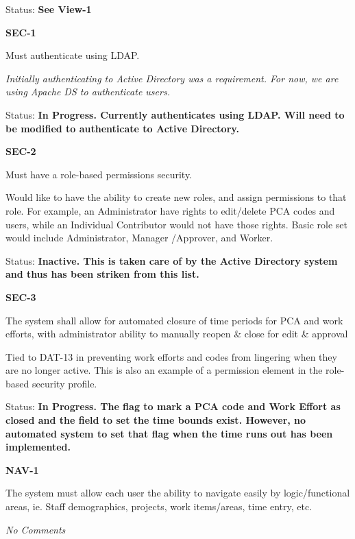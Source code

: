 \documentclass{article}
\begin{document}
\noindent Status: \textbf{See View-1}

\noindent 

\noindent \textbf{SEC-1}

\noindent Must authenticate using LDAP.

\noindent \textit{Initially authenticating to Active Directory was a requirement. For now, we are using Apache DS to authenticate users. }

\noindent Status: \textbf{In Progress.  Currently authenticates using LDAP.  Will need to be modified to authenticate to Active Directory.}\textit{}

\noindent \textit{}

\noindent \textbf{SEC-2}

\noindent Must have a role-based permissions security.

\noindent Would like to have the ability to create new roles, and assign permissions to that role. For example, an Administrator have rights to edit/delete PCA codes and users, while an Individual Contributor would not have those rights. Basic role set would include Administrator, Manager /Approver, and Worker.

\noindent Status: \textbf{Inactive.  This is taken care of by the Active Directory system and thus has been striken from this list.}

\noindent 

\noindent \textbf{SEC-3}

\noindent The system shall allow for automated closure of time periods for PCA and work efforts, with administrator ability to manually reopen \& close for edit \& approval

\noindent Tied to DAT-13 in preventing work efforts and codes from lingering when they are no longer active. This is also an example of a permission element in the role-based security profile.

\noindent Status: \textbf{In Progress.  The flag to mark a PCA code and Work Effort as closed and the field to set the time bounds exist.  However, no automated system to set that flag when the time runs out has been implemented.}

\noindent 

\noindent \textbf{NAV-1}

\noindent The system must allow each user the ability to navigate easily by logic/functional areas, ie. Staff demographics, projects, work items/areas, time entry, etc.

 \textit{No Comments}
\end{document}
